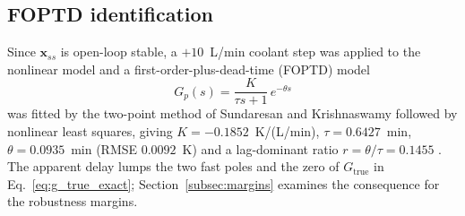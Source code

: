 \subsection{FOPTD identification}
\label{subsec:foptd_identification}
Since $\mathbf{x}_{ss}$ is open-loop stable, a $+10$~L/min coolant step was applied to the nonlinear model and a first-order-plus-dead-time (FOPTD) model
\begin{equation}
    G_p(s) = \frac{K}{\tau s + 1}\,e^{-\theta s}
    \label{eq:foptd}
\end{equation}
was fitted by the two-point method of Sundaresan and Krishnaswamy followed by nonlinear least squares, giving $K = -0.1852$~K/(L/min), $\tau = 0.6427$~min, $\theta = 0.0935$~min (RMSE $0.0092$~K) and a lag-dominant ratio $r = \theta/\tau = 0.1455$ \cite{shinskey1996process, odwyer2009handbook}. The apparent delay lumps the two fast poles and the zero of $G_{\text{true}}$ in Eq.~\eqref{eq:g_true_exact}; Section~\ref{subsec:margins} examines the consequence for the robustness margins.


